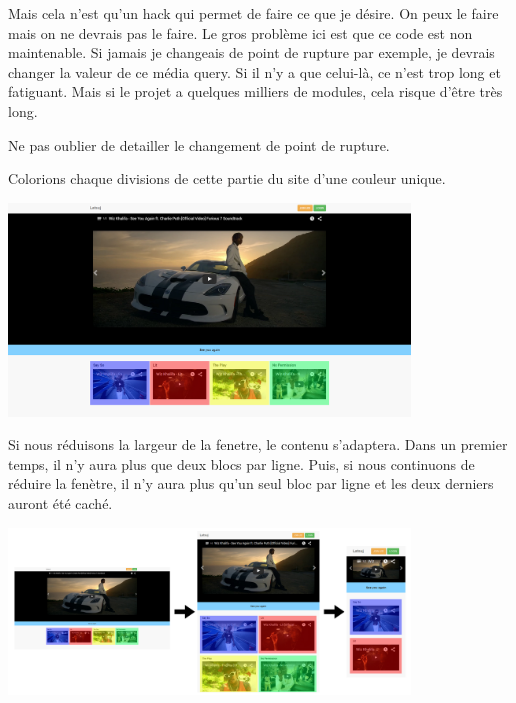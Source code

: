 \documentclass{article}
\begin{document}
\newpage
Mais cela n'est qu'un hack qui permet de faire ce que je d\'esire. On peux le faire mais on ne devrais pas le faire. Le gros probl\`eme ici est que ce code est non maintenable. Si jamais je changeais de point de rupture par exemple, je devrais changer la valeur de ce m\'edia query. Si il n'y a que celui-l\`a, ce n'est trop long et fatiguant. Mais si le projet a quelques milliers de modules, cela risque d'\^etre tr\`es long.



\newpage


Ne pas oublier de detailler le changement de point de rupture.

Colorions chaque divisions de cette partie du site d'une couleur unique.
\begin{center}
\vspace{0.5cm}
\includegraphics[width=0.8\textwidth]{pc4}
\vspace{0.5cm}
\end{center}
Si nous r\'eduisons la largeur de la fenetre, le contenu s'adaptera. Dans un premier temps, il n'y aura plus que deux blocs par ligne. Puis, si nous continuons de r\'eduire la fen\`etre, il n'y aura plus qu'un seul bloc par ligne et les deux derniers auront \'et\'e cach\'e.
\begin{center}
\vspace{0.5cm}
\includegraphics[width=0.8\textwidth]{pc7}
\vspace{0.5cm}\\
\end{center}
\end{document}
